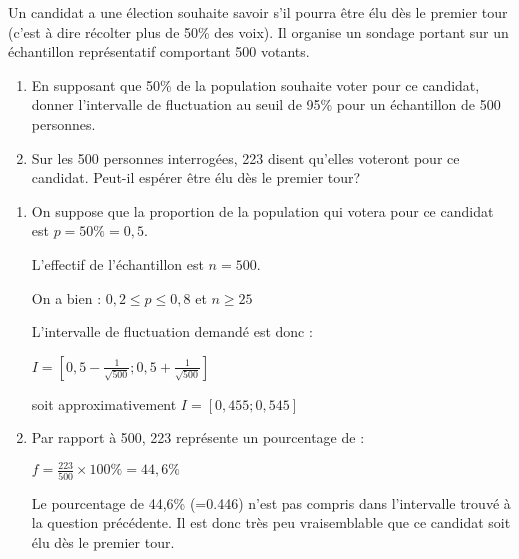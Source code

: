
%
Un candidat a une élection souhaite savoir s'il pourra être élu dès le premier tour (c'est à dire récolter plus de 50\% des voix). Il organise un sondage portant sur un échantillon représentatif comportant 500 votants.
\begin{enumerate}
     \item
     En supposant que 50\% de la population souhaite voter pour ce candidat, donner l'intervalle de fluctuation au seuil de 95\% pour un échantillon de 500 personnes.
     \item
     Sur les 500 personnes interrogées, 223 disent qu'elles voteront pour ce candidat. Peut-il espérer être élu dès le premier tour?
\end{enumerate}
\begin{corrige}
     \begin{enumerate}
          \item
          On suppose que la proportion de la population qui votera pour ce candidat est $p=50\%=0,5$.
          \par
          L'effectif de l'échantillon est $n=500$.
          \par
          On a bien :  $0,2 \leqslant p \leqslant 0,8$ et $n\geqslant 25$
          \par
          L'intervalle de fluctuation demandé est donc :
          \par
          $I=\left[0,5-\frac{1}{\sqrt{500}} ;  0,5+\frac{1}{\sqrt{500}}\right]$
          \par
          soit approximativement $I=\left[0,455 ; 0,545\right]$
          \item
          Par rapport à 500, 223 représente un pourcentage de :
          \par
          $f=\frac{223}{500}\times 100\%=44,6\%$
          \par
          Le pourcentage de 44,6\% (=0.446) n'est pas compris dans l'intervalle trouvé à la question précédente. Il est donc très peu vraisemblable que ce candidat soit élu dès le premier tour.
     \end{enumerate}
\end{corrige}
